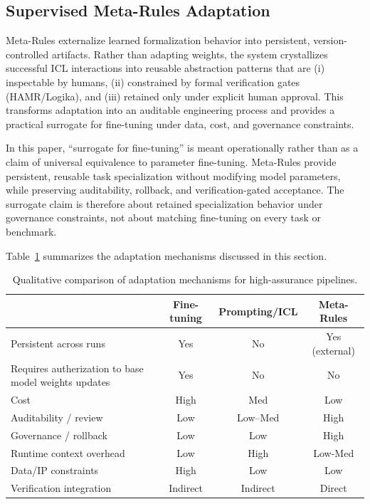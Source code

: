 \documentclass[conference]{IEEEtran}
\begin{document}
\subsection{Supervised Meta-Rules Adaptation}
Meta-Rules externalize learned formalization behavior into persistent, version-controlled artifacts. Rather than adapting weights, the system crystallizes successful ICL interactions into reusable abstraction patterns that are (i) inspectable by humans, (ii) constrained by formal verification gates (HAMR/Logika), and (iii) retained only under explicit human approval. This transforms adaptation into an auditable engineering process and provides a practical surrogate for fine-tuning under data, cost, and governance constraints.

In this paper, ``surrogate for fine-tuning'' is meant operationally rather than as a claim of universal equivalence to parameter fine-tuning. Meta-Rules provide persistent, reusable task specialization without modifying model parameters, while preserving auditability, rollback, and verification-gated acceptance. The surrogate claim is therefore about retained specialization behavior under governance constraints, not about matching fine-tuning on every task or benchmark.

Table~\ref{tab:adaptation-compare} summarizes the adaptation mechanisms discussed in this section.

\begin{table}[!b]
\centering
\caption{Qualitative comparison of adaptation mechanisms for high-assurance pipelines.}
\label{tab:adaptation-compare}
\small
\begin{tabular}{lccc}
\hline
 & Fine-tuning & Prompting/ICL & Meta-Rules \\
\hline
Persistent across runs & Yes & No & Yes (external) \\
Requires autherization to base model weights updates & Yes & No & No \\
Cost & High & Med & Low \\
Auditability / review & Low & Low--Med & High \\
Governance / rollback & Low & Low & High \\
Runtime context overhead & Low & High & Low-Med \\
Data/IP constraints & High & Low & Low \\
Verification integration & Indirect & Indirect & Direct \\
\hline
\end{tabular}
\end{table}
\end{document}
